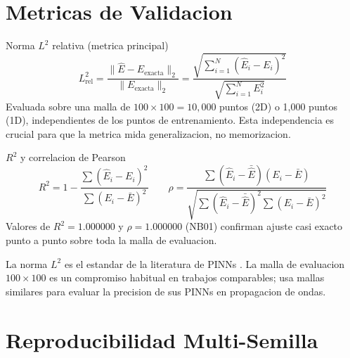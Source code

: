 \documentclass[12pt,a4paper]{article}
\begin{document}
\section{Metricas de Validacion}

\begin{definbox}{Norma $L^2$ relativa (metrica principal)}
\[
  L^2_\text{rel} = \frac{\|\hat{E} - E_\text{exacta}\|_2}{\|E_\text{exacta}\|_2}
  = \frac{\sqrt{\sum_{i=1}^{N}(\hat{E}_i - E_i)^2}}{\sqrt{\sum_{i=1}^{N}E_i^2}}
\]
Evaluada sobre una malla de $100\times100 = 10{,}000$ puntos (2D) o 1,000 puntos (1D),
independientes de los puntos de entrenamiento. Esta independencia es crucial para
que la metrica mida generalizacion, no memorizacion.
\end{definbox}

\begin{definbox}{$R^2$ y correlacion de Pearson}
\[
  R^2 = 1 - \frac{\sum(\hat{E}_i - E_i)^2}{\sum(E_i - \bar{E})^2}
  \qquad
  \rho = \frac{\sum(\hat{E}_i - \bar{\hat{E}})(E_i - \bar{E})}{
  \sqrt{\sum(\hat{E}_i-\bar{\hat{E}})^2\sum(E_i-\bar{E})^2}}
\]
Valores de $R^2 = 1.000000$ y $\rho = 1.000000$ (NB01) confirman ajuste casi
exacto punto a punto sobre toda la malla de evaluacion.
\end{definbox}

\begin{litbox}
La norma $L^2$ es el estandar de la literatura de PINNs \parencite{raissi2019}.
La malla de evaluacion $100\times100$ es un compromiso habitual en trabajos
comparables; \textcite{schoder2024} usa mallas similares para evaluar la
precision de sus PINNs en propagacion de ondas.
\end{litbox}

\section{Reproducibilidad Multi-Semilla}
\end{document}
